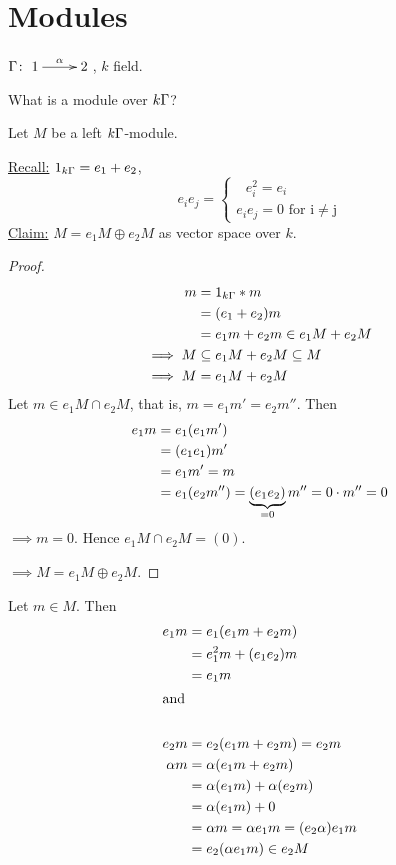 \section{Modules}
\begin{exam}
$\Gamma\colon \xymatrix{1\ar[r]^\alpha & 2}$, $k$ field. 
	
What is a module over $k\Gamma$? 

Let $M$ be a left $k\Gamma$-module.
	
\underline{Recall:} 
$1_{k\Gamma}=e_1 + e_2$, 
\[e_ie_j=  \begin{cases}	\text{\ $e_i^2 = e_i$}\\
  \text{$e_ie_j = 0$ for i$\neq$j}
\end{cases}\]
\underline{Claim:} $M = e_1M\oplus e_2M$ as vector space over $k$.
\begin{proof}
  \begin{align}
    m & = 1_{k\Gamma}*m\notag\\
        & =(e_1 + e_2)m\notag\\
        & = e_1m+e_2m \in e_1M + e_2M\notag\\
\implies M & \subseteq e_1M + e_2M \subseteq M\notag\\
 \implies M & = e_1M + e_2M\notag
\end{align}
 Let  $m \in e_1M \cap e_2M$, that is, $m=e_1m'=e_2m''$. Then
\begin{align}
 e_1m & = e_1(e_1m')\notag\\
          & = (e_1e_1)m'\notag\\
          & = e_1m' = m\notag\\
          & = e_1(e_2m'')=\underbrace{(e_1e_2)}_{=0}m''=0\cdot
          m''=0\notag
\end{align}
$\implies m = 0$. Hence $e_1M \cap e_2M = (0)$.

\noindent $\implies M = e_1M \oplus e_2M$. 
\end{proof}

Let \(m\in M\).  Then 
\begin{align}
e_1m & = e_1(e_1m + e_2m)\notag\\
         & = e_1^2m + (e_1e_2)m\notag\\
         & = e_1m\notag\\
\intertext{and}\notag\\
 e_2m & = e_2(e_1m + e_2m) = e_2m\notag\\
\alpha m & = \alpha(e_1m + e_2m)\notag\\
               & = \alpha(e_1m) + \alpha(e_2m)\notag\\
               & = \alpha(e_1m) + 0\notag\\
               & = \alpha m = \alpha e_1 m = (e_2\alpha)e_1m\notag\\
               & = e_2(\alpha e_1 m)\in e_2M\notag
\end{align}


\end{exam}
